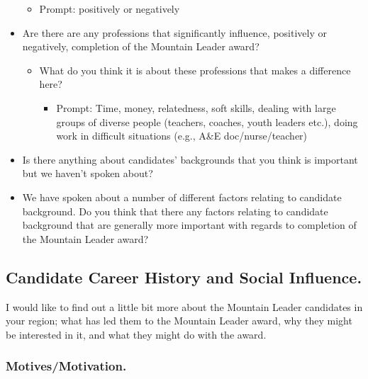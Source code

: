 \documentclass[
  12pt,
  a4paper,
]{book}
\providecommand{\tightlist}{%
  \setlength{\itemsep}{0pt}\setlength{\parskip}{0pt}}
\begin{document}
\begin{itemize}
  \begin{itemize}
  \tightlist
  \item
    Prompt: positively or negatively
  \end{itemize}
\item
  Are there are any professions that significantly influence, positively or negatively, completion of the Mountain Leader award?

  \begin{itemize}
  \tightlist
  \item
    What do you think it is about these professions that makes a difference here?

    \begin{itemize}
    \tightlist
    \item
      Prompt: Time, money, relatedness, soft skills, dealing with large groups of diverse people (teachers, coaches, youth leaders etc.), doing work in difficult situations (e.g., A\&E doc/nurse/teacher)
    \end{itemize}
  \end{itemize}
\item
  Is there anything about candidates' backgrounds that you think is important but we haven't spoken about?
\item
  We have spoken about a number of different factors relating to candidate background. Do you think that there any factors relating to candidate background that are generally more important with regards to completion of the Mountain Leader award?
\end{itemize}

\hypertarget{candidate-career-history-and-social-influence.}{%
\subsection{Candidate Career History and Social Influence.}\label{candidate-career-history-and-social-influence.}}

I would like to find out a little bit more about the Mountain Leader candidates in your region; what has led them to the Mountain Leader award, why they might be interested in it, and what they might do with the award.

\hypertarget{motivesmotivation.}{%
\subsubsection{Motives/Motivation.}\label{motivesmotivation.}}
\end{document}
